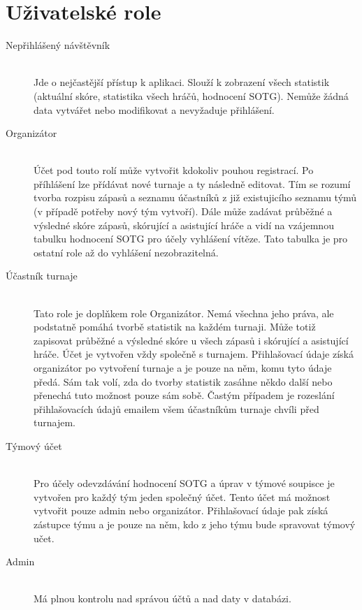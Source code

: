 \documentclass[thesis=B,czech]{FITthesis}[2012/06/26]
\begin{document}
\section{Uživatelské role}


\begin{description}
  \item[Nepřihlášený návštěvník] \hfill \\
  Jde o nejčastější přístup k aplikaci. Slouží k zobrazení všech statistik (aktuální skóre,
  statistika všech hráčů, hodnocení SOTG). Nemůže žádná data vytvářet nebo modifikovat
  a nevyžaduje přihlášení.
  
  \item[Organizátor] \hfill \\
  Účet pod touto rolí může vytvořit kdokoliv pouhou registrací. Po příhlášení lze přídávat
  nové turnaje a ty následně editovat. Tím se rozumí tvorba rozpisu zápasů a seznamu účastníků
  z již existujicího seznamu týmů (v případě potřeby nový tým vytvoří). Dále může zadávat
  průběžné a výsledné skóre zápasů, skórující a asistující hráče a vidí na vzájemnou tabulku
  hodnocení SOTG pro účely vyhlášení vítěze. Tato tabulka je pro ostatní role až do vyhlášení
  nezobrazitelná.
  
  \item[Účastník turnaje] \hfill \\
  Tato role je doplňkem role Organizátor. Nemá všechna jeho práva, ale podstatně pomáhá
  tvorbě statistik na každém turnaji. Může totiž zapisovat průběžné a výsledné skóre u všech
  zápasů i skórující a asistující hráče. Účet je vytvořen vždy společně s turnajem.
  Přihlašovací údaje získá organizátor po vytvoření turnaje a je pouze na něm, komu tyto
  údaje předá. Sám tak volí, zda do tvorby statistik zasáhne někdo další nebo přenechá
  tuto možnost pouze sám sobě. Častým případem je rozeslání přihlašovacích údajů emailem všem
  účastníkům turnaje chvíli před turnajem.
  
  \item[Týmový účet] \hfill \\
  Pro účely odevzdávání hodnocení SOTG a úprav v týmové soupisce je vytvořen pro každý tým
  jeden společný účet. Tento účet má možnost vytvořit pouze admin nebo organizátor.
  Přihlašovací údaje pak získá zástupce týmu a je pouze na něm, kdo z jeho týmu bude
  spravovat týmový učet.
  
  \item[Admin] \hfill \\
  Má plnou kontrolu nad správou účtů a nad daty v databázi.  
\end{description}
\end{document}

